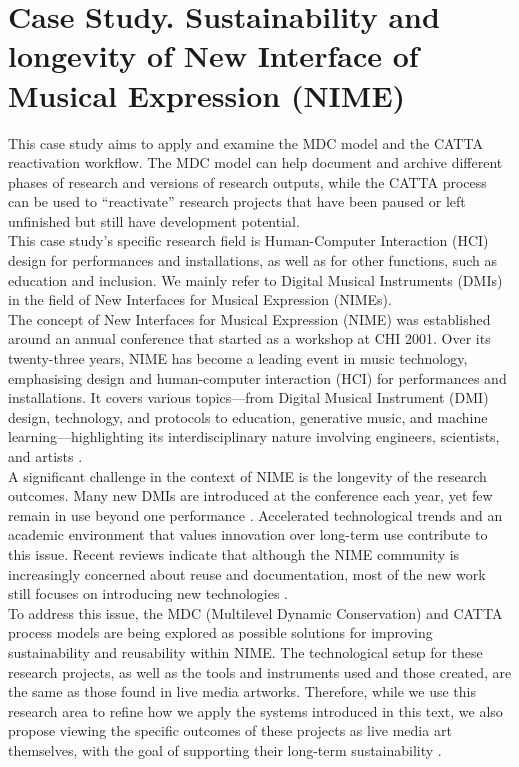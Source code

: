 \chapter{\label{ax:d-sustainability_and_longevity_of_nimes}Case Study. Sustainability and longevity of New Interface of Musical Expression (NIME)}

This case study aims to apply and examine the MDC model and the CATTA reactivation workflow. The MDC model can help document and archive different phases of research and versions of research outputs, while the CATTA process can be used to “reactivate” research projects that have been paused or left unfinished but still have development potential.\\
This case study's specific research field is Human-Computer Interaction (HCI) design for performances and installations, as well as for other functions, such as education and inclusion. We mainly refer to Digital Musical Instruments (DMIs) in the field of New Interfaces for Musical Expression (NIMEs).\\
The concept of New Interfaces for Musical Expression (NIME) was established around an annual conference that started as a workshop at CHI 2001. Over its twenty-three years, NIME has become a leading event in music technology, emphasising design and human-computer interaction (HCI) for performances and installations. It covers various topics—from Digital Musical Instrument (DMI) design, technology, and protocols to education, generative music, and machine learning—highlighting its interdisciplinary nature involving engineers, scientists, and artists \cite{fasciani202120}.\\
A significant challenge in the context of NIME is the longevity of the research outcomes. Many new DMIs are introduced at the conference each year, yet few remain in use beyond one performance \cite{mamedes2014nime, morreale2017nime}. Accelerated technological trends \cite{devine2019decomposed, burkart2012cyberliberties} and an academic environment that values innovation over long-term use \cite{marquez2015fourteenyears, heyes2020nime} contribute to this issue. Recent reviews indicate that although the NIME community is increasingly concerned about reuse and documentation, most of the new work still focuses on introducing new technologies \cite{masu2023nime}.\\
To address this issue, the MDC (Multilevel Dynamic Conservation) and CATTA process models are being explored as possible solutions for improving sustainability and reusability within NIME. The technological setup for these research projects, as well as the tools and instruments used and those created, are the same as those found in live media artworks. Therefore, while we use this research area to refine how we apply the systems introduced in this text, we also propose viewing the specific outcomes of these projects as live media art themselves, with the goal of supporting their long-term sustainability \cite{fiordelmondo2024nime}.\\
